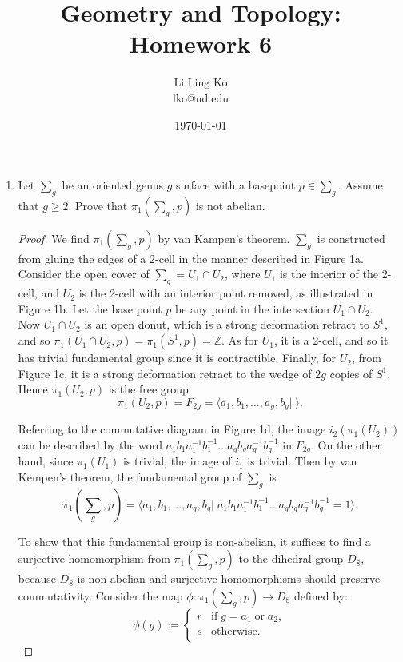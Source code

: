 \documentclass{article}
\begin{document}
\title{Geometry and Topology: Homework 6}
\author{Li Ling Ko\\ lko@nd.edu}
\date{\today}
\maketitle

\begin{enumerate}[label={\bf Q\arabic*:}]
  \item Let $\sum_g$ be an oriented genus $g$ surface with a basepoint
    $p\in\sum_g$. Assume that $g\geq2$. Prove that $\pi_1(\sum_g,p)$ is not
    abelian.
    \begin{proof}
      We find $\pi_1(\sum_g,p)$ by van Kampen's theorem. $\sum_g$ is
      constructed from gluing the edges of a 2-cell in the manner described
      in Figure 1a. Consider the open cover of $\sum_g=U_1\cap U_2$, where
      $U_1$ is the interior of the 2-cell, and $U_2$ is the 2-cell with an
      interior point removed, as illustrated in Figure 1b. Let the base
      point $p$ be any point in the intersection $U_1\cap U_2$. \\

      Now $U_1\cap U_2$ is an open donut, which is a strong deformation
      retract to $S^1$, and so $\pi_1(U_1\cap
      U_2,p)=\pi_1(S^1,p)=\mathbb{Z}$. As for $U_1$, it is a 2-cell, and
      so it has trivial fundamental group since it is contractible.
      Finally, for $U_2$, from Figure 1c, it is a strong deformation
      retract to the wedge of $2g$ copies of $S^1$. Hence $\pi_1(U_2,p)$ is
      the free group
      \begin{equation*}
        \pi_1(U_2,p) = F_{2g} = \langle a_1,b_1,\ldots,a_g,b_g|\;\rangle.
      \end{equation*}

      Referring to the commutative diagram in Figure 1d, the image
      $i_2(\pi_1(U_2))$ can be described by the word
      $a_1b_1a_1^{-1}b_1^{-1}\ldots a_gb_ga_g^{-1}b_g^{-1}$ in $F_{2g}$. On
      the other hand, since $\pi_1(U_1)$ is trivial, the image of $i_1$ is
      trivial. Then by van Kempen's theorem, the fundamental group of
      $\sum_g$ is
      \begin{equation*}
        \pi_1(\sum_g,p) = \langle a_1,b_1,\ldots,a_g,b_g|\;
        a_1b_1a_1^{-1}b_1^{-1}\ldots a_gb_ga_g^{-1}b_g^{-1}=1\rangle.
      \end{equation*}

      To show that this fundamental group is non-abelian, it suffices to
      find a surjective homomorphism from $\pi_1(\sum_g,p)$ to the dihedral
      group $D_8$, because $D_8$ is non-abelian and surjective
      homomorphisms should preserve commutativity. Consider the map
      $\phi:\pi_1(\sum_g,p)\rightarrow D_8$ defined by:
      \begin{equation*}
        \phi(g) :=
        \begin{cases}
          r & \text{if}\; g=a_1\; \text{or}\; a_2, \\
          s & \text{otherwise}. \\
        \end{cases}
      \end{equation*}


\end{proof}
\end{enumerate}
\end{document}
